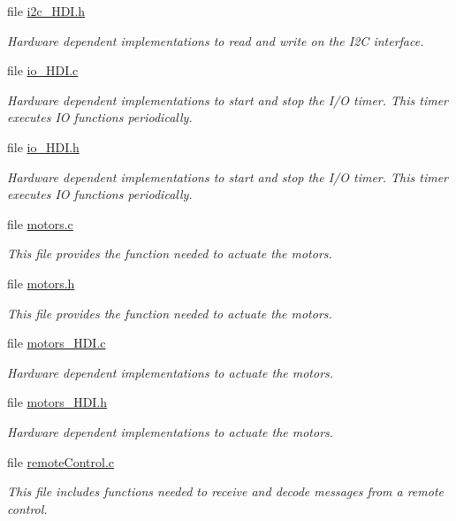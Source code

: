 \begin{DoxyCompactItemize}
file \hyperlink{i2c__HDI_8h}{i2c\+\_\+\+H\+D\+I.\+h}
\begin{DoxyCompactList}\small\item\em Hardware dependent implementations to read and write on the I2\+C interface. \end{DoxyCompactList}\item 
file \hyperlink{io__HDI_8c}{io\+\_\+\+H\+D\+I.\+c}
\begin{DoxyCompactList}\small\item\em Hardware dependent implementations to start and stop the I/\+O timer. This timer executes I\+O functions periodically. \end{DoxyCompactList}\item 
file \hyperlink{io__HDI_8h}{io\+\_\+\+H\+D\+I.\+h}
\begin{DoxyCompactList}\small\item\em Hardware dependent implementations to start and stop the I/\+O timer. This timer executes I\+O functions periodically. \end{DoxyCompactList}\item 
file \hyperlink{motors_8c}{motors.\+c}
\begin{DoxyCompactList}\small\item\em This file provides the function needed to actuate the motors. \end{DoxyCompactList}\item 
file \hyperlink{motors_8h}{motors.\+h}
\begin{DoxyCompactList}\small\item\em This file provides the function needed to actuate the motors. \end{DoxyCompactList}\item 
file \hyperlink{motors__HDI_8c}{motors\+\_\+\+H\+D\+I.\+c}
\begin{DoxyCompactList}\small\item\em Hardware dependent implementations to actuate the motors. \end{DoxyCompactList}\item 
file \hyperlink{motors__HDI_8h}{motors\+\_\+\+H\+D\+I.\+h}
\begin{DoxyCompactList}\small\item\em Hardware dependent implementations to actuate the motors. \end{DoxyCompactList}\item 
file \hyperlink{remoteControl_8c}{remote\+Control.\+c}
\begin{DoxyCompactList}\small\item\em This file includes functions needed to receive and decode messages from a remote control. \end{DoxyCompactList}\item 

\end{DoxyCompactItemize}
